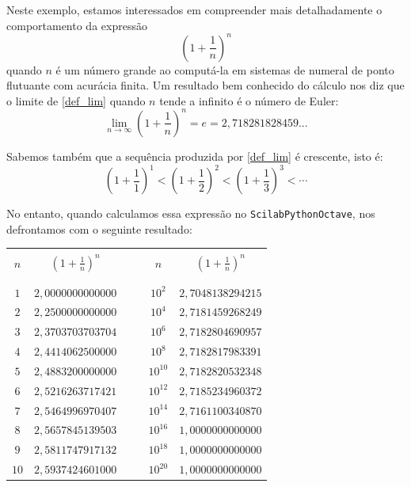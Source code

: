 \begin{ex}\label{ex:cancelamento_euler} Neste exemplo, estamos interessados em compreender mais detalhadamente o comportamento da expressão
\begin{equation}
  \label{def_lim}\left(1+\frac{1}{n}\right)^n
\end{equation}
quando $n$ é um número grande ao computá-la em sistemas de numeral de ponto flutuante com acurácia finita.
Um resultado bem conhecido do cálculo nos diz que o limite de \eqref{def_lim} quando $n$ tende a infinito é o número de Euler:
\begin{equation}\label{lim}
  \lim_{n\to \infty}\left(1+\frac{1}{n}\right)^n=e= 2,718281828459...
\end{equation}

Sabemos também que a sequência produzida por \eqref{def_lim} é crescente, isto é:
\begin{equation} \left(1+\frac{1}{1}\right)^1< \left(1+\frac{1}{2}\right)^2< \left(1+\frac{1}{3}\right)^3 < \cdots  \end{equation}

No entanto, quando calculamos essa expressão no \ifisscilab\verb+Scilab+\fi\ifispython\verb+Python+\fi\ifisoctave\verb+Octave+\fi, nos defrontamos com o seguinte resultado:
\begin{center}
\begin{tabular}{|c|c|c|c|c|}\hline &&&&\\[-0.3cm]
$n$ & $\left(1+\frac{1}{n}\right)^n$&$~~~~$&$n$ & $\left(1+\frac{1}{n}\right)^n$\\ &&&&\\[-0.3cm]\hline\\[-0.3cm]
$1$ & $2,0000000000000$ && $10^{2}$ & $2,7048138294215$ \\
$2$ & $2,2500000000000$ && $10^{4}$ & $2,7181459268249$ \\
$3$ & $2,3703703703704$ && $10^{6}$ & $2,7182804690957$ \\
$4$ & $2,4414062500000$ && $10^{8}$ & $2,7182817983391$ \\
$5$ & $2,4883200000000$ && $10^{10}$ & $2,7182820532348$ \\
$6$ & $2,5216263717421$ && $10^{12}$ & $2,7185234960372$ \\
$7$ & $2,5464996970407$ && $10^{14}$ & $2,7161100340870$ \\
$8$ & $2,5657845139503$ && $10^{16}$ & $1,0000000000000$ \\
$9$ & $2,5811747917132$ && $10^{18}$ & $1,0000000000000$ \\
$10$ & $2,5937424601000$ && $10^{20}$ & $1,0000000000000$ \\\hline
\end{tabular}
\end{center}


\end{ex}
